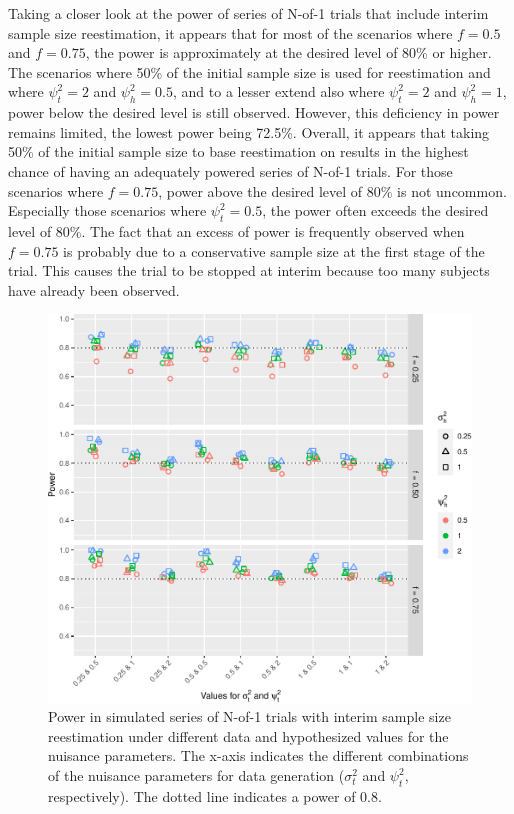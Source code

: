 \documentclass[AMA,STIX1COL,]{WileyNJD-v2}
\begin{document}
Taking a closer look at the power of series of N-of-1 trials that include interim sample size reestimation, it appears that for most of the scenarios where \(f=0.5\) and \(f=0.75\), the power is approximately at the desired level of 80\% or higher. The scenarios where 50\% of the initial sample size is used for reestimation and where \(\psi_t^2 = 2\) and \(\psi_h^2 = 0.5\), and to a lesser extend also where \(\psi_t^2 = 2\) and \(\psi_h^2 = 1\), power below the desired level is still observed. However, this deficiency in power remains limited, the lowest power being 72.5\%. Overall, it appears that taking 50\% of the initial sample size to base reestimation on results in the highest chance of having an adequately powered series of N-of-1 trials. For those scenarios where \(f = 0.75\), power above the desired level of 80\% is not uncommon. Especially those scenarios where \(\psi_t^2 = 0.5\), the power often exceeds the desired level of 80\%. The fact that an excess of power is frequently observed when \(f = 0.75\) is probably due to a conservative sample size at the first stage of the trial. This causes the trial to be stopped at interim because too many subjects have already been observed.

\begin{figure}

{\centering \includegraphics{Thesis_files/figure-latex/unnamed-chunk-4-1} 

}

\caption{Power in simulated series of N-of-1 trials with interim sample size reestimation under different data and hypothesized values for the nuisance parameters. The x-axis indicates the different combinations of the nuisance parameters for data generation ($\sigma_t^2$ and $\psi_t^2$, respectively). The dotted line indicates a power of 0.8.\label{fig:reestimpower}}\label{fig:unnamed-chunk-4}
\end{figure}
\end{document}
